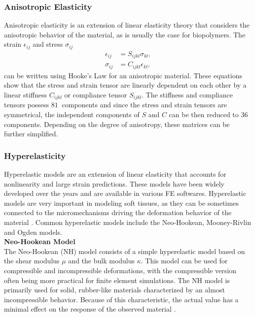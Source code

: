 \subsubsection*{Anisotropic Elasticity}
Anisotropic elasticity is an extension of linear elasticity theory that considers the anisotropic 
behavior of the material, as is usually the case for biopolymers. The strain $\epsilon_{ij}$ and stress $\sigma_{ij}$ 
\begin{align}
        \epsilon_{ij} &= S_{ijkl} \sigma_{kl}, \label{eq:strainanisotropic}\\
        \sigma_{ij} &= C_{ijkl} \epsilon_{kl}, \label{eq:stressanisotropic}
\end{align}
can be written using Hooke's Law for an anisotropic material. These equations 
show that the stress and strain tensor are linearly dependent on each other by a linear stiffness $C_{ijkl}$ 
or compliance tensor $S_{ijkl}$. The stiffness and compliance tensors possess $\SI{81}{}$ components and 
since the stress and strain tensors are symmetrical, the independent components of $S$ and $C$ can be then reduced 
to $\SI{36}{}$ components. Depending on the degree of anisotropy, these matrices can be further simplified. 

\subsubsection*{Hyperelasticity}
Hyperelastic models are an extension of linear elasticity that accounts for nonlinearity 
and large strain predictions. These models have been widely developed over the years and 
are available in various FE softwares. Hyperelastic models are very important in modeling 
soft tissues, as they can be sometimes connected to the micromechanisms driving the 
deformation behavior of the material \cite{Bergström2015}. Common hyperelastic models include the 
Neo-Hookean, Mooney-Rivlin and Ogden models.\\

\textbf{Neo-Hookean Model}\\

The Neo-Hookean (NH) model consists of a simple hyperelastic model based on the shear 
modulus $\mu$ and the bulk modulus $\kappa$. This model can be used for compressible 
and incompressible deformations, with the compressible version often being more 
practical for finite element simulations. The NH model is primarily used for 
solid, rubber-like materials characterized by an almost incompressible behavior. 
Because of this characteristic, the actual value has a minimal effect on the response 
of the observed material \cite{Bergström2015}.

